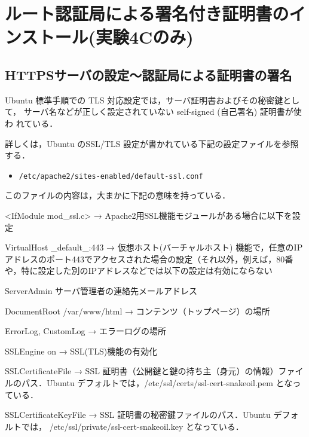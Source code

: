 
\section{ルート認証局による署名付き証明書のインストール(実験4Cのみ)}

\subsection{HTTPSサーバの設定～認証局による証明書の署名 }

Ubuntu 標準手順での TLS 対応設定では，サーバ証明書およびその秘密鍵として，
サーバ名などが正しく設定されていない self-signed (自己署名) 証明書が使わ
れている．


詳しくは，Ubuntu のSSL/TLS 設定が書かれている下記の設定ファイルを参照する．

\begin{itemize}
    \item \texttt{/etc/apache2/sites-enabled/default-ssl.conf}
\end{itemize}

このファイルの内容は，大まかに下記の意味を持っている．

\begin{cli}
<IfModule mod_ssl.c>
→ Apache2用SSL機能モジュールがある場合に以下を設定

VirtualHost _default_:443
→ 仮想ホスト(バーチャルホスト) 機能で，任意のIPアドレスのポート443でアクセスされた場合の設定（それ以外，例えば，80番や，特に設定した別のIPアドレスなどでは以下の設定は有効にならない

ServerAdmin サーバ管理者の連絡先メールアドレス

DocumentRoot /var/www/html
→ コンテンツ（トップページ）の場所

ErrorLog, CustomLog
→ エラーログの場所

SSLEngine on
→ SSL(TLS)機能の有効化

SSLCertificateFile
→ SSL 証明書（公開鍵と鍵の持ち主（身元）の情報）ファイルのパス．Ubuntu デフォルトでは，/etc/ssl/certs/ssl-cert-snakeoil.pem となっている．

SSLCertificateKeyFile
→ SSL 証明書の秘密鍵ファイルのパス．Ubuntu デフォルトでは，
/etc/ssl/private/ssl-cert-snakeoil.key となっている．

\end{cli}

